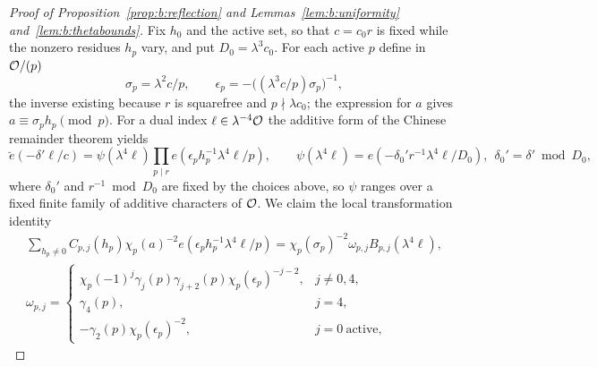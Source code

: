 \begin{proof}[Proof of Proposition~\ref{prop:b:reflection} and Lemmas~\ref{lem:b:uniformity} and~\ref{lem:b:thetabounds}]
Fix $h_0$ and the active set, so that $c=c_0r$ is fixed while the nonzero residues $h_p$ vary, and put $D_0=\lambda^3c_0$. For each active $p$ define in $\mathcal{O}/(p)$
\[
  \sigma_p=\lambda^2c/p,\qquad\epsilon_p=-\bigl((\lambda^3c/p)\sigma_p\bigr)^{-1},
\]
the inverse existing because $r$ is squarefree and $p\nmid\lambda c_0$; the expression for $a$ gives $a\equiv\sigma_ph_p\pmod p$. For a dual index $\ell\in\lambda^{-4}\mathcal{O}$ the additive form of the Chinese remainder theorem yields
\begin{equation}\label{eq:b:rayadditivecrt}
  \breve e(-\delta'\ell/c)=\psi(\lambda^4\ell)\prod_{p\mid r}e(\epsilon_ph_p^{-1}\lambda^4\ell/p),\qquad\psi(\lambda^4\ell)=e(-\delta_0'r^{-1}\lambda^4\ell/D_0),\ \ \delta_0'=\delta'\bmod D_0,
\end{equation}
where $\delta_0'$ and $r^{-1}\bmod D_0$ are fixed by the choices above, so $\psi$ ranges over a fixed finite family of additive characters of $\mathcal{O}$. We claim the local transformation identity
\begin{equation}\label{eq:b:raylocaltransform}
  \begin{gathered}
  \sum_{h_p\ne0}C_{p,j}(h_p)\chi_p(a)^{-2}e(\epsilon_ph_p^{-1}\lambda^4\ell/p)=\chi_p(\sigma_p)^{-2}\omega_{p,j}B_{p,j}(\lambda^4\ell),\\
  \omega_{p,j}=\begin{cases}\chi_p(-1)^j\gamma_j(p)\gamma_{j+2}(p)\chi_p(\epsilon_p)^{-j-2},&j\ne0,4,\\\gamma_4(p),&j=4,\\-\gamma_2(p)\chi_p(\epsilon_p)^{-2},&j=0\ \text{active},\end{cases}
  \end{gathered}
\end{equation}

\end{proof}
